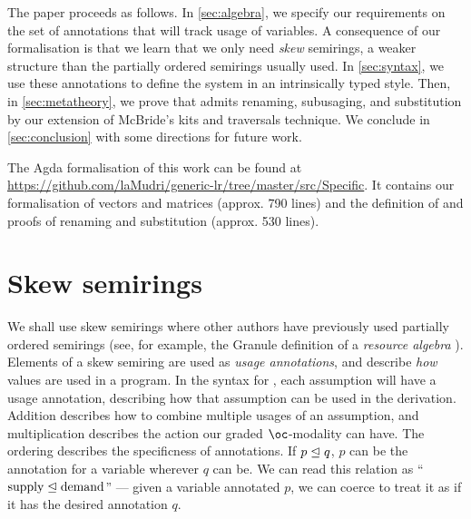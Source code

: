 \documentclass[submission,copyright,creativecommons]{eptcs}
\begin{document}


The paper proceeds as follows.
In \autoref{sec:algebra}, we specify our requirements on the set of annotations
that will track usage of variables. A consequence of our formalisation is that we learn that we only need \emph{skew} semirings, a weaker structure than the partially ordered semirings usually used.
In \autoref{sec:syntax}, we use these annotations to define the system
\name{} in an intrinsically typed style.
Then, in \autoref{sec:metatheory}, we prove that \name{} admits renaming, subusaging, and
substitution by our extension of McBride's kits and traversals technique.
We conclude in \autoref{sec:conclusion} with some directions for future work.

The Agda formalisation of this work can be found at
\url{https://github.com/laMudri/generic-lr/tree/master/src/Specific}.
It contains our formalisation of vectors and
matrices (approx. 790 lines) and the definition of \name{} and proofs of
renaming and substitution (approx. 530 lines).

\section{Skew semirings}\label{sec:algebra}

We shall use skew semirings where other authors have previously used partially ordered
semirings (see, for example, the Granule definition of a \emph{resource algebra}
\cite{Granule18}).
Elements of a skew semiring are used as \emph{usage annotations}, and describe
\emph{how} values are used in a program.
In the syntax for \name{}, each assumption will have a usage annotation,
describing how that assumption can be used in the derivation.
Addition describes how to combine multiple usages of an assumption, and
multiplication describes the action our graded $\oc$-modality can have.
The ordering describes the specificness of annotations.
If $p \trianglelefteq q$, $p$ can be the annotation for a variable wherever $q$ can be.
We can read this relation as ``$\textrm{supply} \trianglelefteq \textrm{demand}$'' ---
given a variable annotated $p$, we can coerce to treat it as if it has the
desired annotation $q$.
\end{document}

